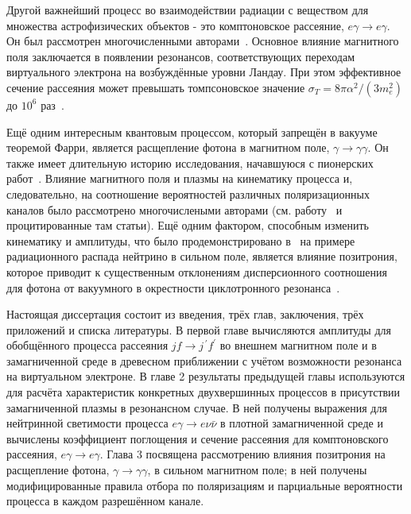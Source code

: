 
Другой важнейший процесс во взаимодействии радиации с веществом для множества астрофизических объектов 
- это комптоновское рассеяние, $e\gamma\to e\gamma$. Он был рассмотрен многочисленными 
авторами~\cite{Canuto1971,Gnedin1974,Blandford1976,Borner1979,DeRaad1974,Herold:1979,Harding:1986,Bussard1986,
Wasserman1980,Harding1991,Graziani1993,Harding1995,Gonthier:2014wja,Mushtukov:2015qul}.
Основное влияние магнитного поля заключается в 
появлении резонансов, соответствующих переходам виртуального электрона на возбуждённые уровни Ландау. 
При этом эффективное сечение рассеяния может превышать томпсоновское значение $\sigma_T = 8\pi\alpha^2 / (3m_e^2)$ 
до $10^6$ раз~\cite{Mushtukov:2015qul}.


Ещё одним интересным квантовым процессом, который запрещён в вакууме теоремой Фарри, является расщепление фотона 
в магнитном поле, $\gamma\to\gamma\gamma$. Он также имеет длительную историю исследования, начавшуюся с пионерских 
работ~\cite{Adler:1970,Adler:1971}. Влияние магнитного поля и плазмы на кинематику процесса и, следовательно, на 
соотношение вероятностей различных поляризационных каналов было рассмотрено многочислеными авторами (см. работу~\cite{RChSt:2012} 
и процитированные там статьи). Ещё одним фактором, способным изменить кинематику и амплитуды, что было продемонстрировано 
в~\cite{AM12} на примере радиационного распада нейтрино в сильном поле, является влияние позитрония, которое 
приводит к существенным отклонениям дисперсионного соотношения для фотона от вакуумного в окрестности циклотронного 
резонанса~\cite{ShabUsov1986}.


Настоящая диссертация состоит из введения, трёх глав, заключения, трёх приложений и списка литературы. В первой главе 
вычисляются амплитуды для обобщённого процесса рассеяния $jf \to j^{\, \prime} f^{\prime}$ во внешнем магнитном поле и в замагниченной среде в 
древесном приближении с учётом возможности резонанса на виртуальном электроне. В главе 2 результаты предыдущей главы 
используются для расчёта характеристик конкретных двухвершинных процессов в присутствии замагниченной плазмы в резонансном случае. 
В ней получены выражения для нейтринной светимости процесса $e\gamma\to e\nu\bar\nu$ в плотной замагниченной среде и 
вычислены коэффициент поглощения и сечение рассеяния для комптоновского рассеяния, $e\gamma\to e\gamma$. Глава 3 посвящена 
рассмотрению влияния позитрония на расщепление фотона, $\gamma\to\gamma\gamma$, в сильном магнитном поле; в ней получены 
модифицированные правила отбора по поляризациям и парциальные вероятности процесса в каждом разрешённом канале.




